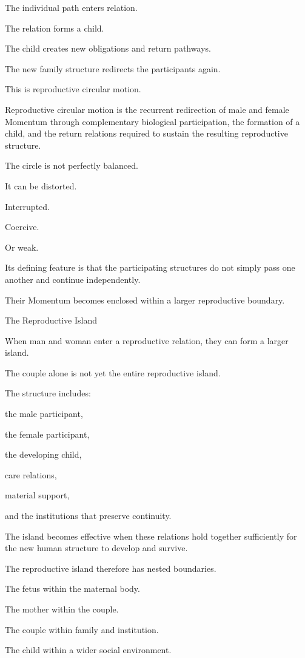 The individual path enters relation.

The relation forms a child.

The child creates new obligations and return pathways.

The new family structure redirects the participants again.

This is reproductive circular motion.

Reproductive circular motion is the recurrent redirection of male and female Momentum through complementary biological participation, the formation of a child, and the return relations required to sustain the resulting reproductive structure.

The circle is not perfectly balanced.

It can be distorted.

Interrupted.

Coercive.

Or weak.

Its defining feature is that the participating structures do not simply pass one another and continue independently.

Their Momentum becomes enclosed within a larger reproductive boundary.

The Reproductive Island

When man and woman enter a reproductive relation, they can form a larger island.

The couple alone is not yet the entire reproductive island.

The structure includes:

the male participant,

the female participant,

the developing child,

care relations,

material support,

and the institutions that preserve continuity.

The island becomes effective when these relations hold together sufficiently for the new human structure to develop and survive.

The reproductive island therefore has nested boundaries.

The fetus within the maternal body.

The mother within the couple.

The couple within family and institution.

The child within a wider social environment.

